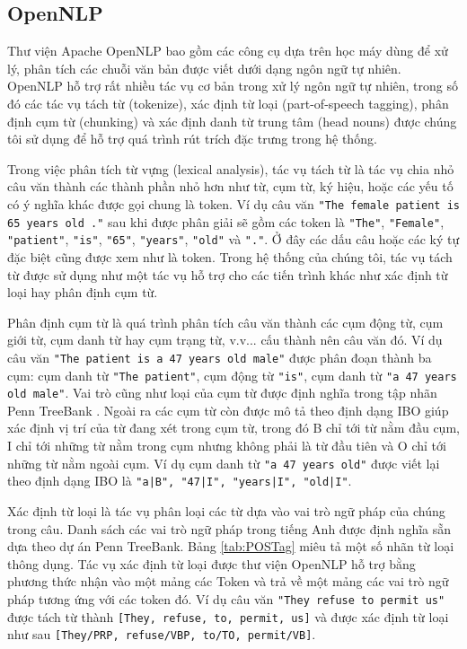 \subsection*{OpenNLP}
Thư viện Apache OpenNLP bao gồm các công cụ dựa trên học máy dùng để xử lý, phân tích các chuỗi văn bản được viết dưới dạng ngôn ngữ tự nhiên. OpenNLP hỗ trợ rất nhiều tác vụ cơ bản trong xử lý ngôn ngữ tự nhiên, trong số đó các tác vụ tách từ (tokenize), xác định từ loại (part-of-speech tagging), phân định cụm từ (chunking) và xác định danh từ trung tâm (head nouns) được chúng tôi sử dụng để hỗ trợ quá trình rút trích đặc trưng trong hệ thống. 

Trong việc phân tích từ vựng (lexical analysis), tác vụ tách từ là tác vụ chia nhỏ câu văn thành các thành phần nhỏ hơn như từ, cụm từ, ký hiệu, hoặc các yếu tố có ý nghĩa khác được gọi chung là token. Ví dụ câu văn \texttt{"The female patient is 65 years old ."} sau khi được phân giải sẽ gồm các token là \texttt{"The"}, \texttt{"Female"}, \texttt{"patient"}, \texttt{"is"}, \texttt{"65"}, \texttt{"years"}, \texttt{"old"} và \texttt{"."}. Ở đây các dấu câu hoặc các ký tự đặc biệt cũng được xem như là token. Trong hệ thống của chúng tôi, tác vụ tách từ được sử dụng như một tác vụ hỗ trợ cho các tiến trình khác như xác định từ loại hay phân định cụm từ.

Phân định cụm từ là quá trình phân tích câu văn thành các cụm động từ, cụm giới từ, cụm danh từ hay cụm trạng từ, v.v... cấu thành nên câu văn đó. Ví dụ câu văn \texttt{"The patient is a 47 years old male"} được phân đoạn thành ba cụm: cụm danh từ \texttt{"The patient"}, cụm động từ \texttt{"is"}, cụm danh từ \texttt{"a 47 years old male"}. Vai trò cũng như loại của cụm từ được định nghĩa trong tập nhãn Penn TreeBank \cite{Santorini1990}. Ngoài ra các cụm từ còn được mô tả theo định dạng IBO giúp xác định vị trí của từ đang xét trong cụm từ, trong đó B chỉ tới từ nằm đầu cụm, I chỉ tới những từ nằm trong cụm nhưng không phải là từ đầu tiên và O chỉ tới những từ nằm ngoài cụm. Ví dụ cụm danh từ \texttt{"a 47 years old"} được viết lại theo định dạng IBO là \texttt{"a|B", "47|I", "years|I", "old|I"}.

Xác định từ loại là tác vụ phân loại các từ dựa vào vai trò ngữ pháp của chúng trong câu. Danh sách các vai trò ngữ pháp trong tiếng Anh được định nghĩa sẵn dựa theo dự án Penn TreeBank. Bảng \ref{tab:POSTag} miêu tả một số nhãn từ loại thông dụng. Tác vụ xác định từ loại được thư viện OpenNLP hỗ trợ bằng phương thức nhận vào một mảng các Token và trả về một mảng các vai trò ngữ pháp tương ứng với các token đó. Ví dụ câu văn \texttt{"They refuse to permit us"} được tách từ thành \texttt{[They, refuse, to, permit, us]} và được xác định từ loại như sau \texttt{[They/PRP, refuse/VBP, to/TO, permit/VB]}.

